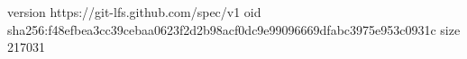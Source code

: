 version https://git-lfs.github.com/spec/v1
oid sha256:f48efbea3cc39cebaa0623f2d2b98acf0dc9e99096669dfabc3975e953c0931c
size 217031
